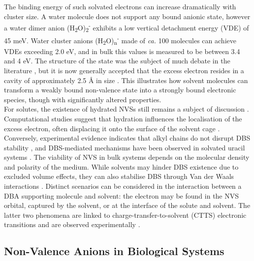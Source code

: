 The binding energy of such solvated electrons can increase dramatically with cluster size. A water molecule does not support any bound anionic state\cite{herbert2015quantum}, however a water dimer anion (H\textsubscript{2}O)\textsubscript{2}\textsuperscript{-} exhibits a low vertical detachment energy (VDE) of 45 meV\cite{coe1990photoelectron}. Water cluster anions (H\textsubscript{2}O)\textsubscript{n}\textsuperscript{-} made of \emph{ca.} 100 molecules can achieve VDEs exceeding 2.0 eV\cite{verlet2005observation}, and in bulk this values is measured to be between 3.4 and 4 eV\cite{coe2008photoelectron,siefermann2010binding}. The structure of the state was the subject of much debate in the literature \cite{kumar2015simple,herbert2019structure,herbert2017hydrated,kevan1981solvated}, but it is now generally accepted that the excess electron resides in a cavity of approximately 2.5 \r{A} in size \cite{herbert2019structure}. This illustrates how solvent molecules can transform a weakly bound non-valence state into a strongly bound electronic species, though with significantly altered properties.\\ 

For solutes, the existence of hydrated NVSs still remains a subject of discussion \cite{anusiewicz2020fate,castellani2019stability,larsen2010does}. Computational studies suggest that hydration influences the localisation of the excess electron, often displacing it onto the surface of the solvent cage \cite{anusiewicz2020fate}. Conversely, experimental evidence indicates that alkyl chains do not disrupt DBS stability \cite{castellani2019stability}, and DBS-mediated mechanisms have been observed in solvated uracil systems \cite{narayanan2024electron}. The viability of NVS in bulk systems depends on the molecular density and polarity of the medium. While solvents may hinder DBS existence due to excluded volume effects, they can also stabilise DBS through Van der Waals interactions \cite{bradforth2002excited,chen2000precursors}. Distinct scenarios can be considered in the interaction between a DBA supporting molecule and solvent: the electron may be found in the NVS orbital, captured by the solvent, or at the interface of the solute and solvent. The latter two phenomena are linked to charge-transfer-to-solvent (CTTS) electronic transitions and are observed experimentally \cite{chen2000precursors,bradforth2002excited,messina2013real,carter2023birth}.\\

\subsection{Non-Valence Anions in Biological Systems}

